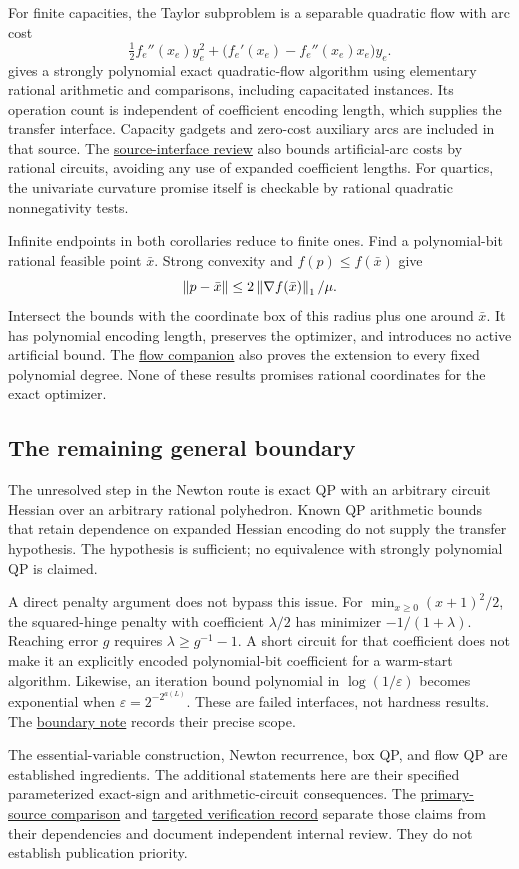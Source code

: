 For finite capacities, the Taylor subproblem is a separable quadratic flow
with arc cost
\[
 \tfrac12 f_e''(x_e)y_e^2+
       \bigl(f_e'(x_e)-f_e''(x_e)x_e\bigr)y_e.
\]
\citet[Theorem~20]{Vegh2016} gives a strongly polynomial exact quadratic-flow
algorithm using elementary rational arithmetic and comparisons, including
capacitated instances. Its operation count is independent of coefficient
encoding length, which supplies the transfer interface. Capacity gadgets
and zero-cost auxiliary arcs are included in that source. The
\href{../constrained-exact/network-flow-review.md}{source-interface review}
also bounds artificial-arc costs by rational circuits, avoiding any use of
expanded coefficient lengths. For quartics, the univariate curvature
promise itself is checkable by rational quadratic nonnegativity tests.

Infinite endpoints in both corollaries reduce to finite ones. Find a
polynomial-bit rational feasible point $\bar x$. Strong convexity and
$f(p)\le f(\bar x)$ give
\[
 \left\lVert p-\bar x\right\rVert\le2\left\lVert\nabla f(\bar x)\right\rVert_1/\mu.
\]
Intersect the bounds with the coordinate box of this radius plus one
around $\bar x$. It has polynomial encoding length, preserves the optimizer,
and introduces no active artificial bound. The
\href{../constrained-exact/network-flow.md}{flow companion}
also proves the extension to every fixed polynomial degree. None of these
results promises rational coordinates for the exact optimizer.

\subsection{The remaining general boundary}

The unresolved step in the Newton route is exact QP with an arbitrary
circuit Hessian over an arbitrary rational polyhedron. Known QP arithmetic
bounds that retain dependence on expanded Hessian encoding do not supply
the transfer hypothesis. The hypothesis is sufficient; no equivalence with
strongly polynomial QP is claimed.

A direct penalty argument does not bypass this issue. For
$\min_{x\ge0}(x+1)^2/2$, the squared-hinge penalty with coefficient
$\lambda/2$ has minimizer $-1/(1+\lambda)$. Reaching error $g$ requires
$\lambda\ge g^{-1}-1$. A short circuit for that coefficient does not make
it an explicitly encoded polynomial-bit coefficient for a warm-start
algorithm. Likewise, an iteration bound polynomial in
$\log(1/\varepsilon)$ becomes exponential when
$\varepsilon=2^{-2^{a(L)}}$. These are failed interfaces, not hardness
results. The
\href{../constrained-exact/general-boundary.md}{boundary note}
records their precise scope.

The essential-variable construction, Newton recurrence, box QP, and flow QP
are established ingredients. The additional statements here are their
specified parameterized exact-sign and arithmetic-circuit consequences.
The \href{../literature/constrained-prior.md}{primary-source comparison}
and \href{../constrained-exact/verification.md}{targeted verification record}
separate those claims from their dependencies and document independent
internal review. They do not establish publication priority.
